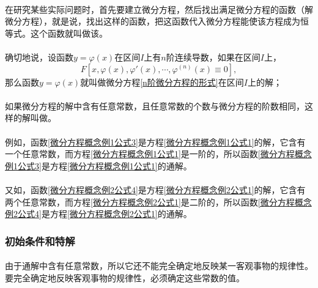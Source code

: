 \paragraph{}
在研究某些实际问题时，首先要建立微分方程，然后找出满足微分方程的函数（解微分方程），就是说，找出这样的函数，把这函数代入微分方程能使该方程成为恒等式。这个函数就叫做该。

\paragraph{}
确切地说，设函数$y=\varphi(x)$在区间$I$上有$n$阶连续导数，如果在区间$I$上，
\begin{equation}
  F[x,\varphi(x),\varphi'(x),\cdots,\varphi^{(n)}(x) \equiv 0],
\end{equation}
那么函数$y=\varphi(x)$就叫做微分方程\eqref{n阶微分方程的形式}在区间$I$上的解；

\paragraph{}
如果微分方程的解中含有任意常数，且任意常数的个数与微分方程的阶数相同，这样的解叫做。

\paragraph{}
例如，函数\eqref{微分方程概念例1公式3}是方程\eqref{微分方程概念例1公式1}的解，它含有一个任意常数，而方程\eqref{微分方程概念例1公式1}是一阶的，所以函数\eqref{微分方程概念例1公式3}是方程\eqref{微分方程概念例1公式1}的通解。

\paragraph{}
又如，函数\eqref{微分方程概念例2公式4}是方程\eqref{微分方程概念例2公式1}的解，它含有两个任意常数，而方程\eqref{微分方程概念例2公式1}是二阶的，所以函数\eqref{微分方程概念例2公式4}是方程\eqref{微分方程概念例2公式1}的通解。

\subsubsection{初始条件和特解}
\paragraph{}
由于通解中含有任意常数，所以它还不能完全确定地反映某一客观事物的规律性。要完全确定地反映客观事物的规律性，必须确定这些常数的值。

